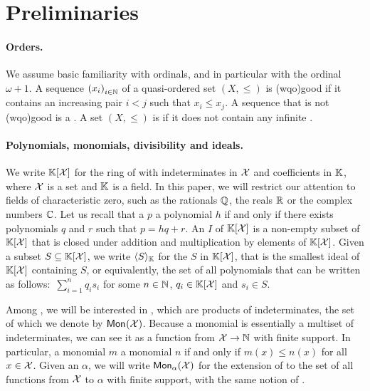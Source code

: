 \section{Preliminaries}
\label{sec:preliminaries}

\paragraph{Orders.} We assume basic familiarity with
ordinals, and in particular with the ordinal $\omega+1$.
 A sequence $\seqof{x_i}[i
\in \N]$ of a quasi-ordered set $(X,\leq)$ is
\intro(wqo){good} if it contains an increasing pair $i <
j$ such that $x_i \leq x_j$. A sequence that is not
\kl(wqo){good} is a . A set
$(X,\leq)$ is  if it does not
contain any infinite .

\paragraph{Polynomials, monomials, divisibility and
ideals.} We write $\poly{\K}{\X}$ for the ring of
 with indeterminates in $\X$ and
coefficients in $\K$, where $\X$ is a set and $\K$ is a
field. In this paper, we will restrict our attention to
fields of characteristic zero, such as the rationals
$\Q$, the reals $\R$ or the complex numbers $\C$. Let us
recall that a  $p$  a
polynomial $h$ if and only if there exists polynomials
$q$ and $r$ such that $p = h q + r$. An  $I$
of $\poly{\K}{\X}$ is a non-empty subset of
$\poly{\K}{\X}$ that is closed under addition and
multiplication by elements of $\poly{\K}{\X}$. Given a
subset $S \subseteq \poly{\K}{\X}$, we write
$\gen{S}{\K}$ for the  $S$ in
$\poly{\K}{\X}$, that is the smallest ideal of
$\poly{\K}{\X}$ containing $S$, or equivalently, the set
of all polynomials that can be written as follows:
$\,\sum_{i=1}^n q_i s_i$ for some $n \in \N$, $q_i \in
\poly{\K}{\X}$ and $s_i \in S$.

Among , we will be interested in , which are
products of indeterminates, the set of which we denote by $\mon{\X}$. Because a
monomial is essentially a multiset of indeterminates, we can see it as a
function from $\X \to \N$ with finite support. In particular, a monomial $m$
 a monomial $n$ if and only if $m(x) \leq n(x)$ for all $x \in \X$.
Given an  $\alpha$, we will write $\mon[\alpha]{\X}$ for the
extension of  to the set of all functions from $\X$ to $\alpha$
with finite support, with the same notion of .


